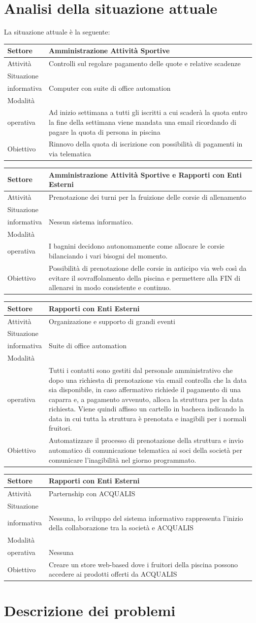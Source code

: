 \documentclass[11pt]{article} %
\newcommand{\AnalisiSituazioneAttualeTabella}[5]{
	\begin{tabular}[c]{|m{1in}|m{2.5in}|}
		\hline
		Settore & #1 \\ \hline
		Attività & #2 \\ \hline
		Situazione \\informativa & #3 \\ \hline
		Modalità \\operativa & #4 \\ \hline
		Obiettivo & #5 \\ \hline
	\end{tabular}
	\vspace{20pt}
}
\begin{document}
\section{Analisi della situazione attuale}

La situazione attuale è la seguente:

\AnalisiSituazioneAttualeTabella
	{Amministrazione Attività Sportive}
	{Controlli sul regolare pagamento delle quote e relative scadenze}
	{Computer con suite di office automation}
	{Ad inizio settimana a tutti gli iscritti a cui scaderà la quota entro la fine della settimana viene mandata una email ricordando di pagare la quota di persona in piscina}
	{Rinnovo della quota di iscrizione con possibilità di pagamenti in via telematica}

\AnalisiSituazioneAttualeTabella
	{Amministrazione Attività Sportive e Rapporti con Enti Esterni}
	{Prenotazione dei turni per la fruizione delle corsie di allenamento}
	{Nessun sistema informatico.}
	{I bagnini decidono autonomamente come allocare le corsie bilanciando i vari bisogni del momento.}
	{Possibilità di prenotazione delle corsie in anticipo via web così da evitare il sovraffolamento della piscina e permettere alla FIN di allenarsi in modo consistente e continuo.}

\AnalisiSituazioneAttualeTabella
	{Rapporti con Enti Esterni}
	{Organizazione e supporto di grandi eventi}
	{Suite di office automation}
	{Tutti i contatti sono gestiti dal personale amministrativo che dopo una richiesta di prenotazione via email controlla che la data sia disponibile, in caso affermativo richiede il pagamento di una caparra e, a pagamento avvenuto, alloca la struttura per la data richiesta. Viene quindi affisso un cartello in bacheca indicando la data in cui tutta la struttura è prenotata e inagibili per i normali fruitori.}
	{Automatizzare il processo di prenotazione della struttura e invio automatico di comunicazione telematica ai soci della società per comunicare l'inagibilità nel giorno programmato.}

\AnalisiSituazioneAttualeTabella
	{Rapporti con Enti Esterni}
	{Parternship con ACQUALIS}
	{Nessuna, lo sviluppo del sistema informativo rappresenta l'inizio della collaborazione tra la società e ACQUALIS}
	{Nessuna}
	{Creare un store web-based dove i fruitori della piscina possono accedere ai prodotti offerti da ACQUALIS}

\section{Descrizione dei problemi}
\end{document}
